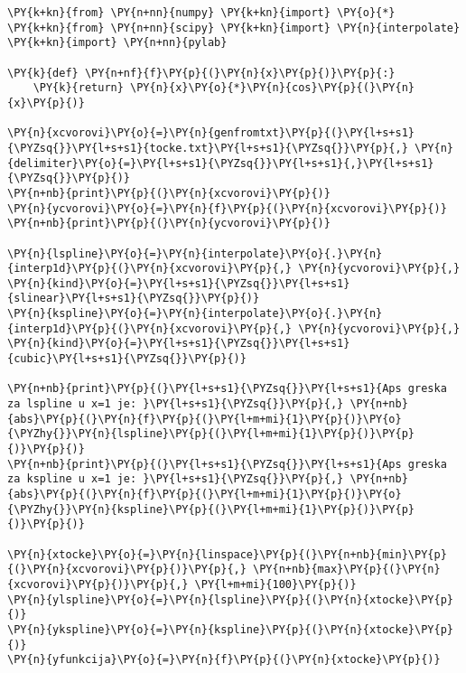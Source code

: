 \begin{Verbatim}[commandchars=\\\{\}]
\PY{k+kn}{from} \PY{n+nn}{numpy} \PY{k+kn}{import} \PY{o}{*}
\PY{k+kn}{from} \PY{n+nn}{scipy} \PY{k+kn}{import} \PY{n}{interpolate}
\PY{k+kn}{import} \PY{n+nn}{pylab}

\PY{k}{def} \PY{n+nf}{f}\PY{p}{(}\PY{n}{x}\PY{p}{)}\PY{p}{:}
    \PY{k}{return} \PY{n}{x}\PY{o}{*}\PY{n}{cos}\PY{p}{(}\PY{n}{x}\PY{p}{)}

\PY{n}{xcvorovi}\PY{o}{=}\PY{n}{genfromtxt}\PY{p}{(}\PY{l+s+s1}{\PYZsq{}}\PY{l+s+s1}{tocke.txt}\PY{l+s+s1}{\PYZsq{}}\PY{p}{,} \PY{n}{delimiter}\PY{o}{=}\PY{l+s+s1}{\PYZsq{}}\PY{l+s+s1}{,}\PY{l+s+s1}{\PYZsq{}}\PY{p}{)}
\PY{n+nb}{print}\PY{p}{(}\PY{n}{xcvorovi}\PY{p}{)}
\PY{n}{ycvorovi}\PY{o}{=}\PY{n}{f}\PY{p}{(}\PY{n}{xcvorovi}\PY{p}{)}
\PY{n+nb}{print}\PY{p}{(}\PY{n}{ycvorovi}\PY{p}{)}

\PY{n}{lspline}\PY{o}{=}\PY{n}{interpolate}\PY{o}{.}\PY{n}{interp1d}\PY{p}{(}\PY{n}{xcvorovi}\PY{p}{,} \PY{n}{ycvorovi}\PY{p}{,} \PY{n}{kind}\PY{o}{=}\PY{l+s+s1}{\PYZsq{}}\PY{l+s+s1}{slinear}\PY{l+s+s1}{\PYZsq{}}\PY{p}{)}
\PY{n}{kspline}\PY{o}{=}\PY{n}{interpolate}\PY{o}{.}\PY{n}{interp1d}\PY{p}{(}\PY{n}{xcvorovi}\PY{p}{,} \PY{n}{ycvorovi}\PY{p}{,} \PY{n}{kind}\PY{o}{=}\PY{l+s+s1}{\PYZsq{}}\PY{l+s+s1}{cubic}\PY{l+s+s1}{\PYZsq{}}\PY{p}{)}

\PY{n+nb}{print}\PY{p}{(}\PY{l+s+s1}{\PYZsq{}}\PY{l+s+s1}{Aps greska za lspline u x=1 je: }\PY{l+s+s1}{\PYZsq{}}\PY{p}{,} \PY{n+nb}{abs}\PY{p}{(}\PY{n}{f}\PY{p}{(}\PY{l+m+mi}{1}\PY{p}{)}\PY{o}{\PYZhy{}}\PY{n}{lspline}\PY{p}{(}\PY{l+m+mi}{1}\PY{p}{)}\PY{p}{)}\PY{p}{)}
\PY{n+nb}{print}\PY{p}{(}\PY{l+s+s1}{\PYZsq{}}\PY{l+s+s1}{Aps greska za kspline u x=1 je: }\PY{l+s+s1}{\PYZsq{}}\PY{p}{,} \PY{n+nb}{abs}\PY{p}{(}\PY{n}{f}\PY{p}{(}\PY{l+m+mi}{1}\PY{p}{)}\PY{o}{\PYZhy{}}\PY{n}{kspline}\PY{p}{(}\PY{l+m+mi}{1}\PY{p}{)}\PY{p}{)}\PY{p}{)}

\PY{n}{xtocke}\PY{o}{=}\PY{n}{linspace}\PY{p}{(}\PY{n+nb}{min}\PY{p}{(}\PY{n}{xcvorovi}\PY{p}{)}\PY{p}{,} \PY{n+nb}{max}\PY{p}{(}\PY{n}{xcvorovi}\PY{p}{)}\PY{p}{,} \PY{l+m+mi}{100}\PY{p}{)}
\PY{n}{ylspline}\PY{o}{=}\PY{n}{lspline}\PY{p}{(}\PY{n}{xtocke}\PY{p}{)}
\PY{n}{ykspline}\PY{o}{=}\PY{n}{kspline}\PY{p}{(}\PY{n}{xtocke}\PY{p}{)}
\PY{n}{yfunkcija}\PY{o}{=}\PY{n}{f}\PY{p}{(}\PY{n}{xtocke}\PY{p}{)}


\end{Verbatim}
